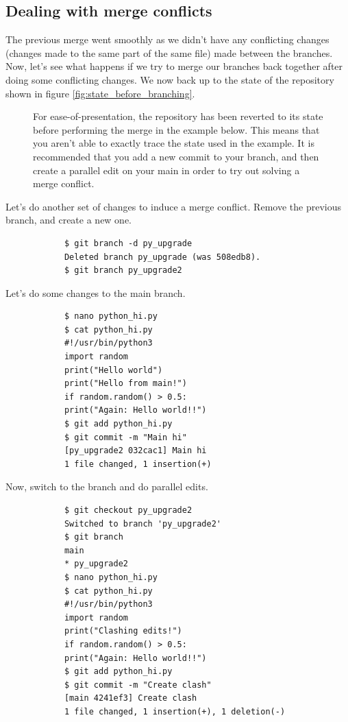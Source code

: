 \documentclass[../main/git_course_main.tex]{subfiles}
\begin{document}
	\subsection{Dealing with merge conflicts}
	
	The previous merge went smoothly as we didn't have any conflicting changes (changes made to the same part of the same file) made between the branches. Now, let's see what happens if we try to merge our branches back together after doing some conflicting changes. We now back up to the state of the repository shown in figure \ref{fig:state_before_branching}.
	
	\begin{figure}[h!]
		\begin{redbox}
			For ease-of-presentation, the repository has been reverted to its state before performing the merge in the example below. This means that you aren't able to exactly trace the state used in the example. It is recommended that you add a new commit to your branch, and then create a parallel edit on your main in order to try out solving a merge conflict.
		\end{redbox}
	\end{figure}
	
	Let's do another set of changes to induce a merge conflict. Remove the previous branch, and create a new one.
	
	\begin{codebox}
		\begin{lstlisting}
			$ git branch -d py_upgrade
			Deleted branch py_upgrade (was 508edb8).
			$ git branch py_upgrade2
		\end{lstlisting}
	\end{codebox}
	
	Let's do some changes to the main branch.
	
	\begin{codebox}
		\begin{lstlisting}
			$ nano python_hi.py
			$ cat python_hi.py
			#!/usr/bin/python3
			import random
			print("Hello world")
			print("Hello from main!")
			if random.random() > 0.5:
			print("Again: Hello world!!")
			$ git add python_hi.py
			$ git commit -m "Main hi"
			[py_upgrade2 032cac1] Main hi
			1 file changed, 1 insertion(+)
		\end{lstlisting}
	\end{codebox}
	
	Now, switch to the branch and do parallel edits.
	
	\begin{codebox}
		\begin{lstlisting}
			$ git checkout py_upgrade2
			Switched to branch 'py_upgrade2'
			$ git branch
			main
			* py_upgrade2
			$ nano python_hi.py
			$ cat python_hi.py
			#!/usr/bin/python3
			import random
			print("Clashing edits!")
			if random.random() > 0.5:
			print("Again: Hello world!!")
			$ git add python_hi.py
			$ git commit -m "Create clash"
			[main 4241ef3] Create clash
			1 file changed, 1 insertion(+), 1 deletion(-)
		\end{lstlisting}
	\end{codebox}
	
\end{document}

